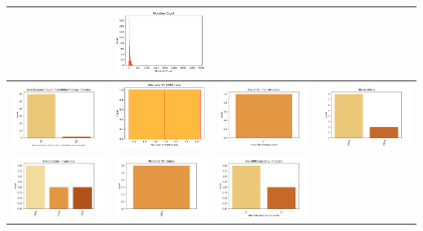 \begin{center}
\begin{tabular}{ |c|c|c|c| }
		& \includegraphics[width=.25\textwidth]{NOTEBOOK/IMAGENES_CRUDAS/64}   
		\\  \hline    
		\includegraphics[width=.22\textwidth]{NOTEBOOK/IMAGENES_CRUDAS/65} 
		& \includegraphics[width=.25\textwidth]{NOTEBOOK/IMAGENES_CRUDAS/66}
		& \includegraphics[width=.25\textwidth]{NOTEBOOK/IMAGENES_CRUDAS/67}
		& \includegraphics[width=.25\textwidth]{NOTEBOOK/IMAGENES_CRUDAS/68} 
		\\  \hline 
		\includegraphics[width=.25\textwidth]{NOTEBOOK/IMAGENES_CRUDAS/69} 
		& \includegraphics[width=.25\textwidth]{NOTEBOOK/IMAGENES_CRUDAS/70} 
		& \includegraphics[width=.25\textwidth]{NOTEBOOK/IMAGENES_CRUDAS/71} 

\end{tabular}
\end{center}
